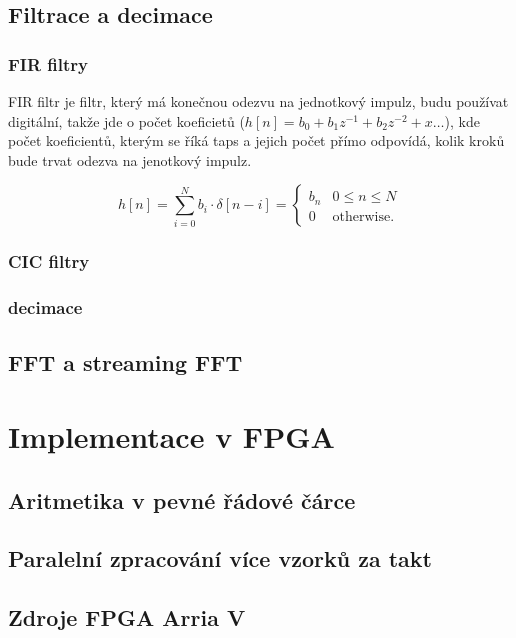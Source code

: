 \subsection{Filtrace a decimace}
\subsubsection{FIR filtry}
FIR filtr je filtr, který má konečnou odezvu na jednotkový impulz, budu používat digitální, takže jde o počet koeficietů ($h[n] = b_0 + b_1z^{-1} + b_2z^{-2} +x\dots$), kde počet koeficientů, kterým se říká taps a jejich počet přímo odpovídá, kolik kroků bude trvat odezva na jenotkový impulz.

\begin{equation}
	h[n] = \sum_{i=0}^{N} b_i \cdot \delta[n-i] = 
	\left\{
	\begin{array}{ll}
		b_n & 0 \leq n \leq N \\
		0 & \mbox{otherwise}.
	\end{array}
	\right.
\end{equation}
\subsubsection{CIC filtry}
\subsubsection{decimace}


\subsection{FFT a streaming FFT}



\section{Implementace v FPGA}
\subsection{Aritmetika v pevné řádové čárce}
\subsection{Paralelní zpracování více vzorků za takt}
\subsection{Zdroje FPGA Arria V}




